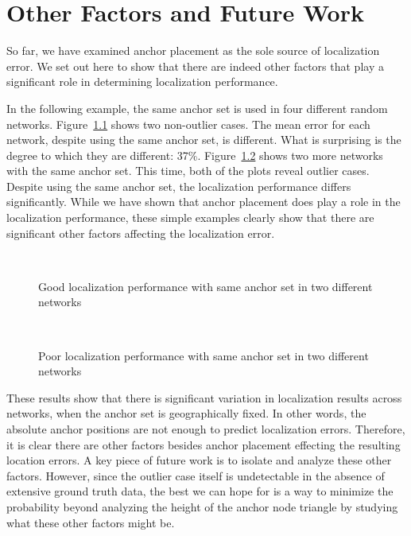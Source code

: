 \chapter{Other Factors and Future Work}
\label{sec:otherfactors}

So far, we have examined anchor placement as the sole source of localization error.  We set out here to show that there are indeed other factors that play a significant role in determining localization performance.

In the following example, the same anchor set is used in four different random networks.  Figure~\ref{fig:AS6good} shows two non-outlier cases.  The mean error for each network, despite using the same anchor set, is different.  What is surprising is the degree to which they are different: 37\%.  Figure~\ref{fig:AS6bad} shows two more networks with the same anchor set.  This time, both of the plots reveal outlier cases.  Despite using the same anchor set, the localization performance differs significantly.  While we have shown that anchor placement does play a role in the localization performance, these simple examples clearly show that there are significant other factors affecting the localization error.

\begin{figure}
  \centering
	\\
	\caption{Good localization performance with same anchor set in two different networks}
	\label{fig:AS6good}
\end{figure}

\begin{figure}
  \centering
\\
    \caption{Poor localization performance with same anchor set in two different networks}
	\label{fig:AS6bad}
\end{figure}

These results show that there is significant variation in localization results across networks, when the anchor set is geographically fixed.  In other words, the absolute anchor positions are not enough to predict localization errors.  Therefore, it is clear there are other factors besides anchor placement effecting the resulting location errors. A key piece of future work is to isolate and analyze these other factors.  However, since the outlier case itself is undetectable in the absence of extensive ground truth data, the best we can hope for is a way to minimize the probability beyond analyzing the height of the anchor node triangle by studying what these other factors might be.  

